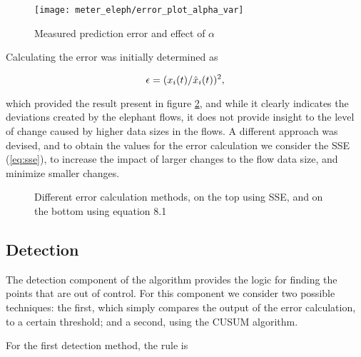 \begin{figure} [H]
    \centering
    \texttt{[image: meter\_eleph/error\_plot\_alpha\_var]}
    \caption {Measured prediction error and effect of $\alpha$}
    \label{fig:error_plot_alpha_var}
\end{figure}

\par Calculating the error was initially determined as

\begin{equation}
    \centering
    \label{eq:division}
    \epsilon = (x_i(t)/\hat{x}_i(t))^2,
\end{equation}

\par which provided the result present in figure \ref{fig:error_plot_division_sse}, and while it clearly indicates the deviations created by the elephant flows, it does not provide insight to the level of change caused by higher data sizes in the flows.
A different approach was devised, and to obtain the values for the error calculation we consider the SSE (\ref{eq:sse}), to increase the impact of larger changes to the flow data size, and minimize smaller changes.

\begin{figure} [H]
    \centering
    \begin{subfigure}
        \texttt{[image: meter\_eleph/error\_plot\_division]}
    \end{subfigure}
    \begin{subfigure}
        \texttt{[image: meter\_eleph/error\_plot\_sse]}
    \end{subfigure}
    \label{fig:error_plot_division_sse}
    \caption{Different error calculation methods, on the top using SSE, and on the bottom using equation 8.1}
\end{figure}

\subsection{Detection}

The detection component of the algorithm provides the logic for finding the points that are out of control. For this component we consider two possible techniques: the first, which simply compares the output of the error calculation, to a certain threshold; 
and a second, using the CUSUM algorithm. 

\par For the first detection method, the rule is 


